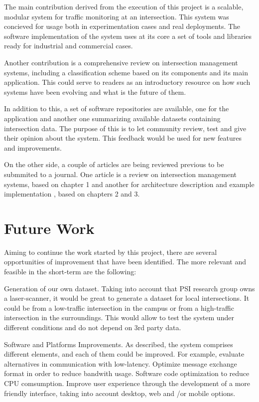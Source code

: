 The main contribution derived from the execution of this project is a scalable, modular system for traffic monitoring at an intersection. This system was concieved for usage both in experimentation cases and real deployments. The software implementation of the system uses at its core a set of tools and libraries ready for industrial and commercial cases.

Another contribution is a comprehensive review on intersection management systems, including a classification scheme based on its components and its main application. This could serve to readers as an introductory resource on how such systems have been evolving and what is the future of them.

In addition to this, a set of software repositories are available, one for the application and another one summarizing available datasets containing intersection data. The purpose of this is to let community review, test and give their opinion about the system. This feedback would be used for new features and improvements. 

On the other side, a couple of articles are being reviewed previous to be submmited to a journal. One article is  a review on intersection management systems, based on chapter 1 and another for architecture description and example implementation , based on chapters 2 and 3.

\section{Future Work}

Aiming to continue the work started by this project, there are several opportunities of improvement that have been identified. The more relevant and feasible in the short-term are the following:

Generation of our own dataset. Taking into account that PSI research group owns a laser-scanner, it would be great to generate a dataset for local intersections. It could be from a low-traffic intersection in the campus or from a high-traffic intersection in the surroundings. This would allow to test the system under different conditions and do not depend on 3rd party data.

Software and Platforms Improvements. As described, the system comprises different elements, and each of them could be improved. For example, evaluate alternatives in communication with low-latency. Optimize message exchange format in order to reduce bandwith usage. Software code optimization to reduce CPU comsumption. Improve user experience through the development of a more friendly interface, taking into account desktop, web and /or mobile options.

